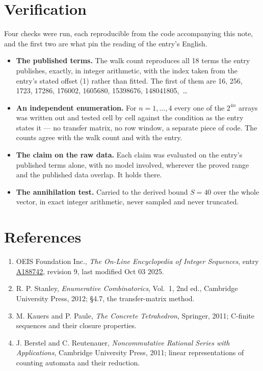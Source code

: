 \documentclass[11pt]{article}
\theoremstyle{definition}
\begin{document}
\section{Verification}

Four checks were run, each reproducible from the code accompanying this note, and the first two are what pin the reading of the entry's English.

\begin{itemize}

\item {\bfseries The published terms.} The walk count reproduces all 18 terms the entry publishes, exactly, in integer arithmetic, with the index taken from the entry's stated offset (1) rather than fitted. The first of them are 16, 256, 1723, 17286, 176002, 1605680, 15398676, 148041805,~\dots

\item {\bfseries An independent enumeration.} For $n = 1,\dots,4$ every one of the $2^{4n}$ arrays was written out and tested cell by cell against the condition as the entry states it --- no transfer matrix, no row window, a separate piece of code. The counts agree with the walk count and with the entry.

\item {\bfseries The claim on the raw data.} Each claim was evaluated on the entry's published terms alone, with no model involved, wherever the proved range and the published data overlap. It holds there.

\item {\bfseries The annihilation test.} Carried to the derived bound $S = 40$ over the whole vector, in exact integer arithmetic, never sampled and never truncated.

\end{itemize}

\section{References}

\begin{enumerate}

\item OEIS Foundation Inc., \emph{The On-Line Encyclopedia of Integer Sequences}, entry \href{https://oeis.org/A188742}{A188742}, revision 9, last modified Oct 03 2025.

\item R. P. Stanley, \emph{Enumerative Combinatorics}, Vol.~1, 2nd ed., Cambridge University Press, 2012; \S4.7, the transfer-matrix method.

\item M. Kauers and P. Paule, \emph{The Concrete Tetrahedron}, Springer, 2011; C-finite sequences and their closure properties.

\item J. Berstel and C. Reutenauer, \emph{Noncommutative Rational Series with Applications}, Cambridge University Press, 2011; linear representations of counting automata and their reduction.

\end{enumerate}
\end{document}
